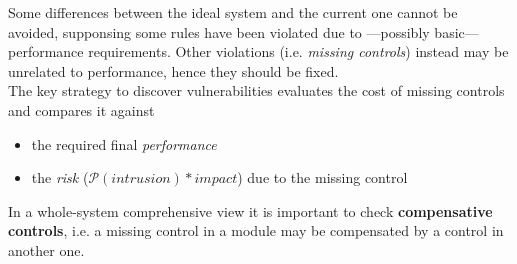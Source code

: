 Some differences between the ideal system and the current one cannot be avoided, supponsing some rules have been violated due to {---}possibly basic{---} performance requirements.
Other violations (i.e. \textit{missing controls}) instead may be unrelated to
performance, hence they should be fixed.\\
The key strategy to discover vulnerabilities evaluates the cost of
missing controls and compares it against
\begin{itemize}
   \item the required final \textit{performance}
   \item the \textit{risk} ($\mathcal{P}(intrusion) *impact$) due to the missing control
\end{itemize}
In a whole-system comprehensive view it is important to check \textbf{compensative controls}, i.e.
a missing control in a module may be compensated by a
control in another one.